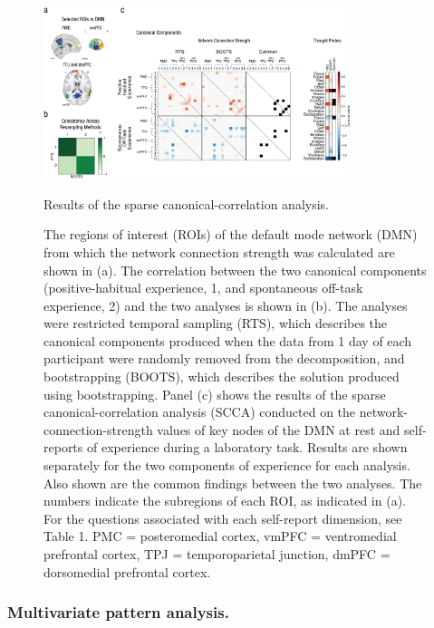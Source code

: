 \begin{figure}
	\centering
	\includegraphics[width=0.8\textwidth]{chapters/img/study1fig2.jpeg}
	\caption{Results of the sparse canonical-correlation analysis.}
	\caption*{\scriptsize{The regions of interest (ROIs) of the default mode network (DMN) from which the network connection strength was calculated are shown in (a). The correlation between the two canonical components (positive-habitual experience, 1, and spontaneous off-task experience, 2) and the two analyses is shown in (b). The analyses were restricted temporal sampling (RTS), which describes the canonical components produced when the data from 1 day of each participant were randomly removed from the decomposition, and bootstrapping (BOOTS), which describes the solution produced using bootstrapping. Panel (c) shows the results of the sparse canonical-correlation analysis (SCCA) conducted on the network-connection-strength values of key nodes of the DMN at rest and self-reports of experience during a laboratory task. Results are shown separately for the two components of experience for each analysis. Also shown are the common findings between the two analyses. The numbers indicate the subregions of each ROI, as indicated in (a). For the questions associated with each self-report dimension, see Table 1. PMC = posteromedial cortex, vmPFC = ventromedial prefrontal cortex, TPJ = temporoparietal junction, dmPFC = dorsomedial prefrontal cortex.}}
	
	\label{fig:study1:fig2}
\end{figure}

\subsubsection{Multivariate pattern analysis.}

